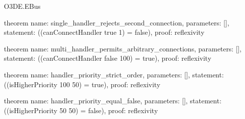 \begin{lexlean}{O3DE.EBus}
\begin{semanticmodule}
theorem{
  name: single_handler_rejects_second_connection,
  parameters: [],
  statement: ((canConnectHandler true 1) = false),
  proof: reflexivity{}
}

theorem{
  name: multi_handler_permits_arbitrary_connections,
  parameters: [],
  statement: ((canConnectHandler false 100) = true),
  proof: reflexivity{}
}

theorem{
  name: handler_priority_strict_order,
  parameters: [],
  statement: ((isHigherPriority 100 50) = true),
  proof: reflexivity{}
}

theorem{
  name: handler_priority_equal_false,
  parameters: [],
  statement: ((isHigherPriority 50 50) = false),
  proof: reflexivity{}
}
\end{semanticmodule}
\end{lexlean}
